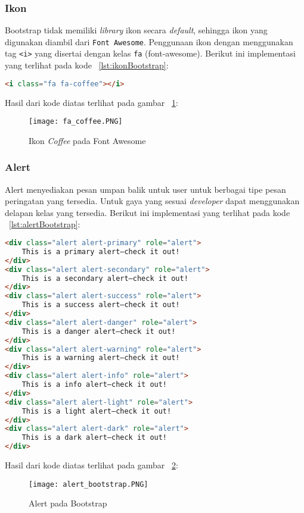 \subsubsection{Ikon}
Bootstrap tidak memiliki \textit{library} ikon secara \textit{default}, sehingga ikon yang digunakan diambil dari \texttt{Font Awesome}. Penggunaan ikon dengan menggunakan tag \texttt{<i>} yang disertai dengan kelas \texttt{fa} (font-awesome). Berikut ini implementasi yang terlihat pada kode ~\ref{lst:ikonBootstrap}:

\begin{lstlisting}[style=customhtml, language=HTML,  basicstyle=\ttfamily, frame=single, columns=fullflexible, keepspaces=true, breaklines=true, showstringspaces=false, label={lst:ikonBootstrap}, caption=Ikon pada bootstrap 4.]
<i class="fa fa-coffee"></i>
\end{lstlisting}

\noindent Hasil dari kode diatas terlihat pada gambar ~\ref{fig:fontAwesomeBootstrap}:
\begin{figure} [H]
	\centering  
	\texttt{[image: fa\_coffee.PNG]}  
	\caption{Ikon \textit{Coffee} pada Font Awesome} 
	\label{fig:fontAwesomeBootstrap}
\end{figure}

\subsubsection{Alert}
Alert menyediakan pesan umpan balik untuk user untuk berbagai tipe pesan peringatan yang tersedia. Untuk gaya yang sesuai \textit{developer} dapat menggunakan delapan kelas yang tersedia. Berikut ini implementasi yang terlihat pada kode ~\ref{lst:alertBootstrap}:

\begin{lstlisting}[style=customhtml, language=HTML,  basicstyle=\ttfamily, frame=single, columns=fullflexible, keepspaces=true, breaklines=true, showstringspaces=false, label={lst:alertBootstrap}, caption=Alert pada bootstrap 4.] 
<div class="alert alert-primary" role="alert">
	This is a primary alert—check it out!
</div>
<div class="alert alert-secondary" role="alert">
	This is a secondary alert—check it out!
</div>
<div class="alert alert-success" role="alert">
	This is a success alert—check it out!
</div>
<div class="alert alert-danger" role="alert">
	This is a danger alert—check it out!
</div>
<div class="alert alert-warning" role="alert">
	This is a warning alert—check it out!
</div>
<div class="alert alert-info" role="alert">
	This is a info alert—check it out!
</div>
<div class="alert alert-light" role="alert">
	This is a light alert—check it out!
</div>
<div class="alert alert-dark" role="alert">
	This is a dark alert—check it out!
</div>
\end{lstlisting}
\noindent Hasil dari kode diatas terlihat pada gambar ~\ref{fig:alertBootstrap}:
\begin{figure} [H]
	\centering  
	\texttt{[image: alert\_bootstrap.PNG]}  
	\caption{Alert pada Bootstrap} 
	\label{fig:alertBootstrap}
\end{figure}

